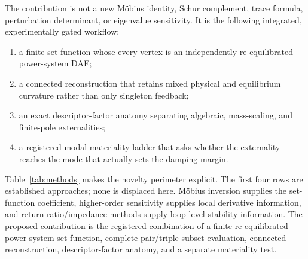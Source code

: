 The contribution is not a new M\"obius identity, Schur complement, trace
formula, perturbation determinant, or eigenvalue sensitivity. It is the
following integrated, experimentally gated workflow:
\begin{enumerate}
    \item a finite set function whose every vertex is an independently
    re-equilibrated power-system DAE;
    \item a connected reconstruction that retains mixed physical and
    equilibrium curvature rather than only singleton feedback;
    \item an exact descriptor-factor anatomy separating algebraic,
    mass-scaling, and finite-pole externalities;
    \item a registered modal-materiality ladder that asks whether the
    externality reaches the mode that actually sets the damping margin.
\end{enumerate}

Table~\ref{tab:methods} makes the novelty perimeter explicit. The first four
rows are established approaches; none is displaced here. M\"obius inversion
supplies the set-function coefficient, higher-order sensitivity supplies local
derivative information, and return-ratio/impedance methods supply loop-level
stability information. The proposed contribution is the registered
combination of a finite re-equilibrated power-system set function, complete
pair/triple subset evaluation, connected reconstruction, descriptor-factor
anatomy, and a separate materiality test.

